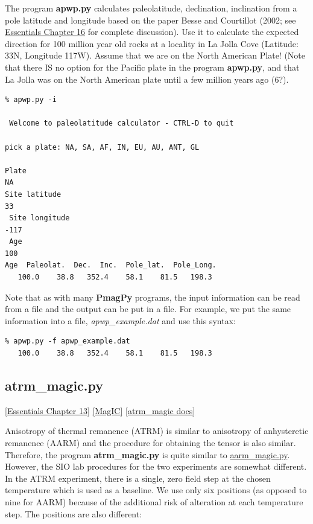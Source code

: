 \documentclass[11pt]{book}
\begin{document}
{{The program {\bf apwp.py} calculates paleolatitude, declination, inclination from  a pole latitude and longitude based on  the paper Besse and Courtillot (2002; see  \href{http://magician.ucsd.edu/Essentials_2/WebBook2ch16.html#apparent_polar_wander_path}{Essentials Chapter 16} for complete discussion).  \nocite{besse02}
Use it  to calculate the expected direction for 100 million year old rocks at a locality in La Jolla Cove (Latitude: 33N, Longitude 117W).    Assume that we are on the North American Plate!  (Note that there IS no option for the Pacific plate in the program {\bf apwp.py}, and that La Jolla was on the North American plate until a few million years ago (6?).   

\begin{verbatim}
% apwp.py -i

 Welcome to paleolatitude calculator - CTRL-D to quit

pick a plate: NA, SA, AF, IN, EU, AU, ANT, GL 

Plate
NA
Site latitude
33
 Site longitude
-117
 Age
100
Age  Paleolat.  Dec.  Inc.  Pole_lat.  Pole_Long.
   100.0    38.8   352.4    58.1    81.5   198.3

\end{verbatim}

Note that as with many {\bf PmagPy}  programs, the input information can be read from a file and the output can be put in a file.   For example, we put the same information into a file, {\it apwp\_example.dat} and use this syntax:

\begin{verbatim}
% apwp.py -f apwp_example.dat
   100.0    38.8   352.4    58.1    81.5   198.3
\end{verbatim}

\subsection{atrm\_magic.py}
{ \href{http://magician.ucsd.edu/Essentials_2/WebBook2ch13.html#ch13}{[Essentials Chapter 13]} 
\href{#MagIC}{[MagIC]}
\href{http://earthref.org/PmagPy/pmagpydocs/atrm_magic-module.html}{[atrm\_magic docs]}

Anisotropy of thermal  remanence (ATRM) is similar to anisotropy of anhysteretic remanence (AARM) and the procedure for obtaining the tensor is also similar.  Therefore, the program {\bf atrm\_magic.py} is quite similar to \href{#aarm_magic.py}{aarm\_magic.py}.  However, the SIO lab procedures for the two experiments are somewhat different.  In the ATRM experiment, there is a single, zero field step at the chosen temperature which is used as a baseline.  We use only six positions (as opposed to nine for AARM) because of the additional risk of alteration at each temperature step.  The positions are also different:  

}}}
\end{document}
